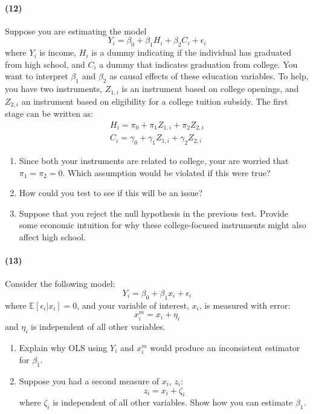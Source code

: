 \documentclass[12pt]{article}
\newcommand\EE{\mathbb{E}}
\newcommand\eps{\epsilon}
\numberwithin{equation}{section}
\numberwithin{figure}{section}
\numberwithin{table}{section}
\begin{document}
\paragraph{(12)} Suppose you are estimating the model
\[Y_i = \beta_0 + \beta_1 H_{i} + \beta_2 C_{i} + \eps_i \]
where $Y_i$ is income, $H_i$ is a dummy indicating if the individual has graduated from high school, and $C_i$ a dummy that indicates graduation from college. You want to interpret $\beta_1$ and $\beta_2$ as causal effects of these education variables. To help, you have two instruments, $Z_{1,i}$ is an instrument based on college openings, and $Z_{2,i}$ an instrument based on eligibility for a college tuition subsidy. The first stage can be written as:
\begin{eqnarray}
  H_i = \pi_0 + \pi_1 Z_{1,i} + \pi_2 Z_{2,i} \nonumber \\
  C_i = \gamma_0 + \gamma_1 Z_{1,i} + \gamma_2 Z_{2,i} \nonumber
\end{eqnarray}
\begin{enumerate}
\item Since both your instruments are related to college, your are worried that $\pi_1=\pi_2=0$. Which assumption would be violated if this were true?
\item How could you test to see if this will be an issue?
\item Suppose that you reject the null hypothesis in the previous test. Provide some economic intuition for why these college-focused instruments might also affect high school.
\end{enumerate}

\paragraph{(13)}
Consider the following model:
\[ Y_i = \beta_0 + \beta_1 x_i + \eps_i \]
where $\EE[\eps_i|x_i]=0$, and your variable of interest, $x_i$, is measured with error:
\[ x^m_i  = x_i + \eta_i \]
and $\eta_i$ is independent of all other variables.
\begin{enumerate}
\item Explain why OLS using $Y_i$ and $x^m_i$ would produce an inconsistent estimator for $\beta_1$.
\item Suppose you had a second measure of $x_i$, $z_i$:
  \[ z_i = x_i + \zeta_i \]
  where $\zeta_i$ is independent of all other variables. Show how you can estimate $\beta_1$.
\end{enumerate}
\end{document}
